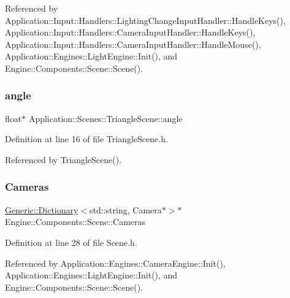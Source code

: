 Referenced by Application\+::\+Input\+::\+Handlers\+::\+Lighting\+Change\+Input\+Handler\+::\+Handle\+Keys(), Application\+::\+Input\+::\+Handlers\+::\+Camera\+Input\+Handler\+::\+Handle\+Keys(), Application\+::\+Input\+::\+Handlers\+::\+Camera\+Input\+Handler\+::\+Handle\+Mouse(), Application\+::\+Engines\+::\+Light\+Engine\+::\+Init(), and Engine\+::\+Components\+::\+Scene\+::\+Scene().

\mbox{\label{classApplication_1_1Scenes_1_1TriangleScene_a398daba41c0317ccb019d714bec0c795}} 
\subsubsection{\texorpdfstring{angle}{angle}}
{\footnotesize\ttfamily float$\ast$ Application\+::\+Scenes\+::\+Triangle\+Scene\+::angle\hspace{0.3cm}{\ttfamily [private]}}



Definition at line 16 of file Triangle\+Scene.\+h.



Referenced by Triangle\+Scene().

\mbox{\label{classEngine_1_1Components_1_1Scene_aea98ff1ced88ee859878b504e9a2a362}} 
\subsubsection{\texorpdfstring{Cameras}{Cameras}}
{\footnotesize\ttfamily \mbox{\hyperlink{classGeneric_1_1Dictionary}{Generic\+::\+Dictionary}}$<$std\+::string, Camera$\ast$$>$$\ast$ Engine\+::\+Components\+::\+Scene\+::\+Cameras\hspace{0.3cm}{\ttfamily [inherited]}}



Definition at line 28 of file Scene.\+h.



Referenced by Application\+::\+Engines\+::\+Camera\+Engine\+::\+Init(), Application\+::\+Engines\+::\+Light\+Engine\+::\+Init(), and Engine\+::\+Components\+::\+Scene\+::\+Scene().

